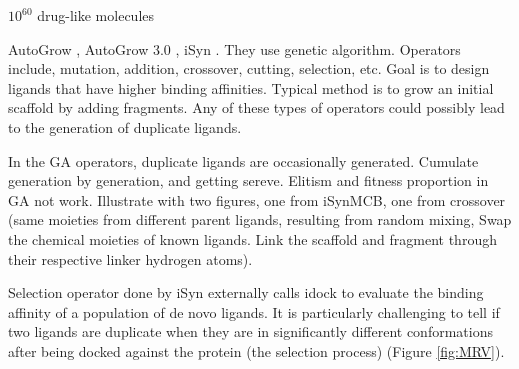 \documentclass[twocolumn]{svjour3}          %
\begin{document}
$10^{60}$ drug-like molecules \cite{1104} %

AutoGrow \cite{466}, AutoGrow 3.0 \cite{1354}, iSyn \cite{1381}. They use genetic algorithm. Operators include, mutation, addition, crossover, cutting, selection, etc. Goal is to design ligands that have higher binding affinities. Typical method is to grow an initial scaffold by adding fragments. Any of these types of operators could possibly lead to the generation of duplicate ligands.

In the GA operators, duplicate ligands are occasionally generated. Cumulate generation by generation, and getting sereve. Elitism and fitness proportion in GA not work. Illustrate with two figures, one from iSynMCB, one from crossover (same moieties from different parent ligands, resulting from random mixing, Swap the chemical moieties of known ligands. Link the scaffold and fragment through their respective linker hydrogen atoms).

Selection operator done by iSyn externally calls idock \cite{1153} to evaluate the binding affinity of a population of de novo ligands. It is particularly challenging to tell if two ligands are duplicate when they are in significantly different conformations after being docked against the protein (the selection process) (Figure \ref{fig:MRV}).
\end{document}
